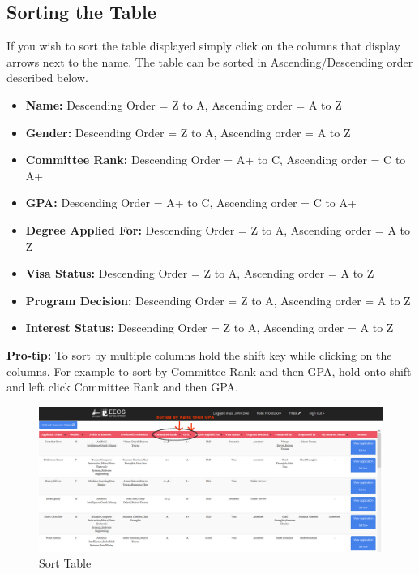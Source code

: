 \documentclass[fontsize=12pt,paper=letter,twoside]{scrartcl}
\begin{document}
\subsection{Sorting the Table}
If you wish to sort the table displayed simply click on the columns that display arrows next to the name. The table can be sorted in Ascending/Descending order described below.
\begin{itemize}
\item \textbf{Name:} Descending Order = Z to A, Ascending order = A to Z
\item \textbf{Gender:} Descending Order = Z to A, Ascending order = A to Z
\item \textbf{Committee Rank:} Descending Order = A+ to C, Ascending order = C to A+
\item \textbf{GPA:} Descending Order = A+ to C, Ascending order = C to A+
\item \textbf{Degree Applied For:} Descending Order = Z to A, Ascending order = A to Z
\item \textbf{Visa Status:} Descending Order = Z to A, Ascending order = A to Z
\item \textbf{Program Decision:} Descending Order = Z to A, Ascending order = A to Z
\item \textbf{Interest Status:} Descending Order = Z to A, Ascending order = A to Z
\end{itemize}
\textbf{Pro-tip:} To sort by multiple columns hold the shift key while clicking on the columns. For example to sort by Committee Rank and then GPA, hold onto shift and left click Committee Rank and then GPA.
\begin{figure}[!htb]
\begin{center}
\includegraphics[width=.99\textwidth]{images/sorted_table.png}
\end{center}
\caption{Sort Table}
\label{fig:sorted_table}
\end{figure}
\clearpage
\end{document}
